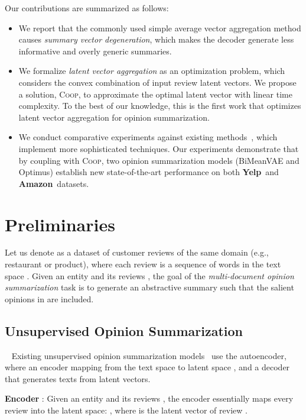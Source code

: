 \documentclass[11pt]{article}
\newcommand{\aggname}{\textsc{Coop}}
\newcommand{\name}{\mbox{\sc BiMeanVAE}}
\newcommand{\yelp}{\mbox{\bf Yelp}}
\newcommand{\amazon}{\mbox{\bf Amazon}}
\begin{document}
Our contributions are summarized as follows:
\begin{itemize}
  \setlength{\parskip}{0cm}
  \setlength{\itemsep}{0cm}
  \item We report that the commonly used simple average vector aggregation method causes {\em summary vector degeneration}, which makes the decoder generate less informative and overly generic summaries.\item We formalize \textit{latent vector aggregation} as an optimization problem, which considers the convex combination of input review latent vectors. We propose a solution, \aggname{}, to approximate the optimal latent vector with linear time complexity. To the best of our knowledge, this is the first work that optimizes latent vector aggregation for opinion summarization.
  \item We conduct comparative experiments against existing methods~\cite{Chu:2019:MeanSum, brazinskas-etal-2020-unsupervised}, which implement more sophisticated techniques. Our experiments demonstrate that by coupling with \aggname{}, two opinion summarization models (\name{} and Optimus) establish  new \mbox{state-of-the-art} performance on both \yelp\ and \amazon\ datasets.
\end{itemize}

\section{Preliminaries}\label{sec:preliminary}
Let us denote  as a dataset of customer reviews of the same domain (e.g., restaurant or product), where each
review is a sequence of words  in the text space . Given an entity  and its reviews , the goal of the \textit{multi-document opinion summarization} task is to generate an abstractive summary  such that the salient opinions in  are included.
\subsection{Unsupervised Opinion Summarization}~\label{sec:method}
Existing unsupervised opinion summarization models~\cite{Chu:2019:MeanSum, brazinskas-etal-2020-unsupervised} use the autoencoder, where an encoder  mapping from the text space  to latent space , and a decoder  that generates texts from latent vectors.

\noindent
{\bf Encoder }: Given an entity  and its reviews , the encoder  essentially maps every review  into the latent space: , where  is the latent vector of review .
\end{document}

